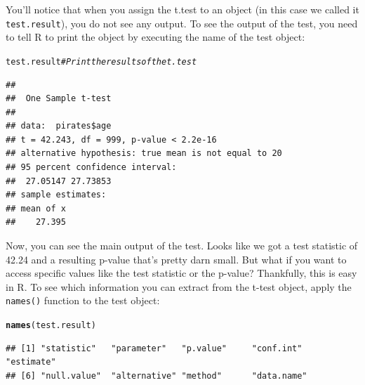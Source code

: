 \documentclass{tufte-book}\usepackage[]{graphicx}\usepackage[]{color}
\makeatletter
\newcommand{\hlcom}[1]{\textcolor[rgb]{0.678,0.584,0.686}{\textit{#1}}}%
\newcommand{\hlstd}[1]{\textcolor[rgb]{0.345,0.345,0.345}{#1}}%
\newcommand{\hlkwd}[1]{\textcolor[rgb]{0.737,0.353,0.396}{\textbf{#1}}}%
\newenvironment{kframe}{%
 \def\at@end@of@kframe{}%
 \ifinner\ifhmode%
  \def\at@end@of@kframe{\end{minipage}}%
  \begin{minipage}{\columnwidth}%
 \fi\fi%
 \def\FrameCommand##1{\hskip\@totalleftmargin \hskip-\fboxsep
 \colorbox{shadecolor}{##1}\hskip-\fboxsep
     \hskip-\linewidth \hskip-\@totalleftmargin \hskip\columnwidth}%
 \MakeFramed {\advance\hsize-\width
   \@totalleftmargin\z@ \linewidth\hsize
   \@setminipage}}%
 {\par\unskip\endMakeFramed%
 \at@end@of@kframe}
\newenvironment{knitrout}{}{} %
\makeatother
\begin{document}
You'll notice that when you assign the t.test to an object (in this case we called it \texttt{test.result}), you do not see any output. To see the output of the test, you need to tell R to print the object by executing the name of the test object:

\begin{footnotesize}
\begin{knitrout}
\color{fgcolor}\begin{kframe}
\begin{alltt}
\hlstd{test.result}  \hlcom{# Print the results of the t.test}
\end{alltt}
\begin{verbatim}
## 
## 	One Sample t-test
## 
## data:  pirates$age
## t = 42.243, df = 999, p-value < 2.2e-16
## alternative hypothesis: true mean is not equal to 20
## 95 percent confidence interval:
##  27.05147 27.73853
## sample estimates:
## mean of x 
##    27.395
\end{verbatim}
\end{kframe}
\end{knitrout}
\end{footnotesize}

Now, you can see the main output of the test. Looks like we got a test statistic of 42.24 and a resulting p-value that's pretty darn small. But what if you want to access specific values like the test statistic or the p-value? Thankfully, this is easy in R. To see which information you can extract from the t-test object, apply the \texttt{names()} function to the test object:


\begin{footnotesize}
\begin{knitrout}
\color{fgcolor}\begin{kframe}
\begin{alltt}
\hlkwd{names}\hlstd{(test.result)}
\end{alltt}
\begin{verbatim}
## [1] "statistic"   "parameter"   "p.value"     "conf.int"    "estimate"   
## [6] "null.value"  "alternative" "method"      "data.name"
\end{verbatim}
\end{kframe}
\end{knitrout}
\end{footnotesize}
\end{document}
